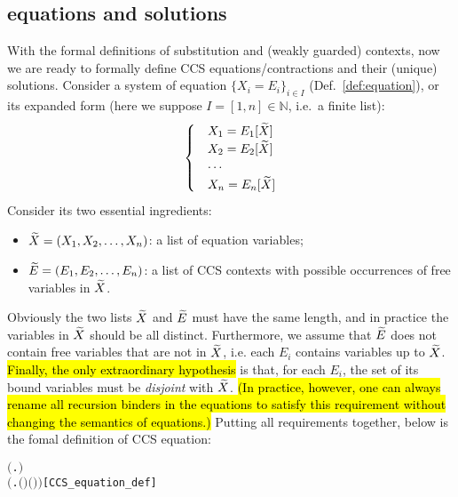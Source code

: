 \subsection{\Multivariate equations and solutions}

With the formal definitions of \multivariate substitution and
\multivariate (weakly guarded) contexts, now we are ready to formally
define \multivariate CCS equations/contractions and their (unique)
solutions. Consider a system of equation $\{X_i = E_i\}_{i\in I}$
(Def.~\ref{def:equation}), or its expanded form (here we suppose $I = [1,n]
\in \mathbb{N}$, i.e.~a finite list):
\begin{equation*}
  \begin{cases}
    &X_1 = E_1[\widetilde X] \\
    &X_2 = E_2[\widetilde X] \\
    & \cdots \\
    &X_n = E_n[\widetilde X]
  \end{cases}
\end{equation*}
Consider its two essential ingredients:
\begin{itemize}
\item $\widetilde X = (X_1, X_2, \ldots, X_n)$: a list of equation variables;
\item $\widetilde E = (E_1, E_2, \ldots, E_n)$: a list of CCS contexts 
  with possible occurrences of free variables in $\widetilde X$.
\end{itemize}
Obviously the two lists $\widetilde X$ and $\widetilde E$ must have the same
length, and in practice the variables in $\widetilde X$ should be all distinct.
Furthermore, we assume that $\widetilde E$ does not contain
 free variables that are not in $\widetilde X$, i.e. each $E_i$ contains
 variables up to $\widetilde X$.
\hl{Finally, the only extraordinary hypothesis} is that, for each
$E_i$, the set of its bound variables must be \emph{disjoint} with
$\widetilde X$. \hl{(In practice, however, one can always
rename all recursion binders in the equations to satisfy this
requirement without changing the semantics of equations.)}
Putting all requirements together, below is the fomal
definition of \multivariate CCS equation:
\begin{alltt}
   \HOLTokenTurnstile{}    \HOLSymConst{\HOLTokenEquiv{}}
        \HOLSymConst{\HOLTokenConj{}}   \HOLSymConst{\ensuremath{=}}   \HOLSymConst{\HOLTokenConj{}}
       \ensuremath{(}\HOLTokenLambda{}.   \HOLSymConst{\HOLTokenSubset{}}  \ensuremath{)}  \HOLSymConst{\HOLTokenConj{}}
       \ensuremath{(}\HOLTokenLambda{}.  \ensuremath{(} \ensuremath{)} \ensuremath{(} \ensuremath{)}\ensuremath{)} \hfill{[CCS_equation_def]}
\end{alltt}

